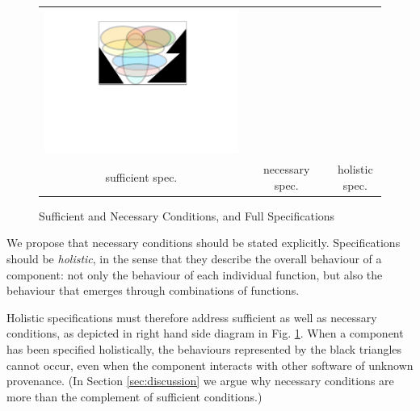 \begin{figure}[htb]
\begin{tabular}{ccccc}
\begin{minipage}{0.25\textwidth}
 \includegraphics[width=\linewidth, trim=250  320 260 60,clip]{diagrams/NecAndSuff.pdf}
\end{minipage}
\\
sufficient  spec.& & necessary spec. & & holistic spec.
 \end{tabular}
  \vspace*{-2.5mm}
  \caption{Sufficient and Necessary Conditions, and Full Specifications}
 \label{fig:NecessaryAndSuff}
 \end{figure}
 
 We propose that  necessary conditions should be stated
 explicitly. Specifications should be \emph{holistic}, in the sense
 that they describe the  overall behaviour of a component: not only the
 behaviour of each individual function, but also the 
 behaviour that emerges through combinations of functions.

Holistic specifications must therefore address sufficient as well as necessary conditions, as  
depicted in right hand side  diagram in Fig. \ref{fig:NecessaryAndSuff}.
When a component has been specified holistically,  the behaviours
represented by the black triangles cannot occur, even when the
component interacts with other software of unknown provenance.
(In Section \ref{sec:discussion} we argue why necessary conditions are more than the complement of
sufficient conditions.)

